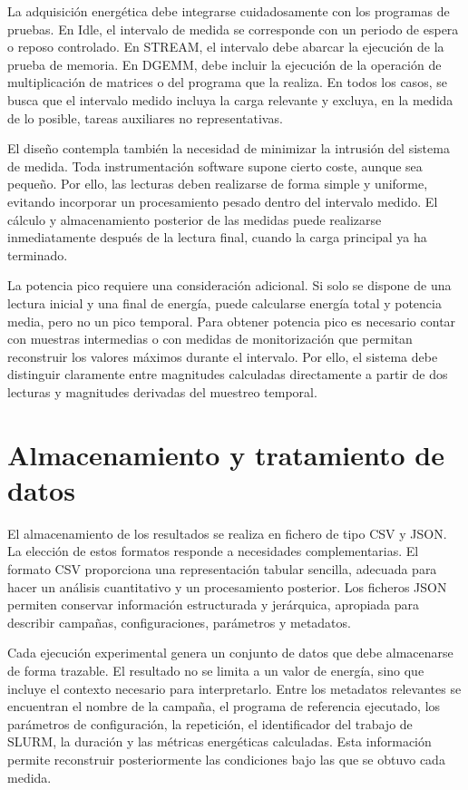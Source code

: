 La adquisición energética debe integrarse cuidadosamente con los programas de pruebas. En Idle, el intervalo de medida se corresponde con un periodo de espera o reposo controlado. En STREAM, el intervalo debe abarcar la ejecución de la prueba de memoria. En DGEMM, debe incluir la ejecución de la operación de multiplicación de matrices o del programa que la realiza. En todos los casos, se busca que el intervalo medido incluya la carga relevante y excluya, en la medida de lo posible, tareas auxiliares no representativas.

El diseño contempla también la necesidad de minimizar la intrusión del sistema de medida. Toda instrumentación software supone cierto coste, aunque sea pequeño. Por ello, las lecturas deben realizarse de forma simple y uniforme, evitando incorporar un procesamiento pesado dentro del intervalo medido. El cálculo y almacenamiento posterior de las medidas puede realizarse inmediatamente después de la lectura final, cuando la carga principal ya ha terminado.

La potencia pico requiere una consideración adicional. Si solo se dispone de una lectura inicial y una final de energía, puede calcularse energía total y potencia media, pero no un pico temporal. Para obtener potencia pico es necesario contar con muestras intermedias o con medidas de monitorización que permitan reconstruir los valores máximos durante el intervalo. Por ello, el sistema debe distinguir claramente entre magnitudes calculadas directamente a partir de dos lecturas y magnitudes derivadas del muestreo temporal.

\section{Almacenamiento y tratamiento de datos}
\label{sec:almacenamiento-implementacion}

El almacenamiento de los resultados se realiza en fichero de tipo CSV y JSON. La elección de estos formatos responde a necesidades complementarias. El formato CSV proporciona una representación tabular sencilla, adecuada para hacer un análisis cuantitativo y un procesamiento posterior. Los ficheros JSON permiten conservar información estructurada y jerárquica, apropiada para describir campañas, configuraciones, parámetros y metadatos.

Cada ejecución experimental genera un conjunto de datos que debe almacenarse de forma trazable. El resultado no se limita a un valor de energía, sino que incluye el contexto necesario para interpretarlo. Entre los metadatos relevantes se encuentran el nombre de la campaña, el programa de referencia ejecutado, los parámetros de configuración, la repetición, el identificador del trabajo de SLURM, la duración y las métricas energéticas calculadas. Esta información permite reconstruir posteriormente las condiciones bajo las que se obtuvo cada medida.


